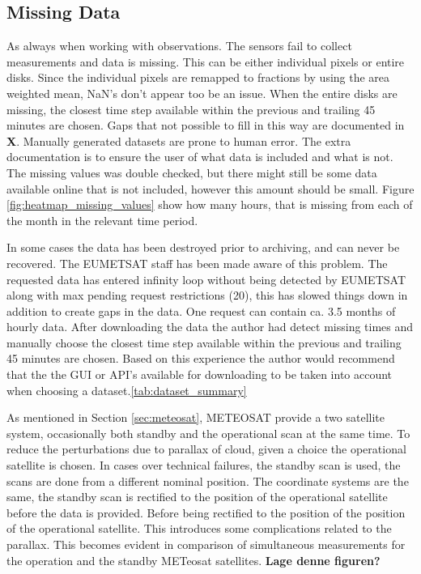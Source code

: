 \subsection{Missing Data} \label{sec:missing_values}
As always when working with observations. The sensors fail to collect  measurements and data is missing. This can be either individual pixels or entire disks. Since the individual pixels are remapped to fractions by using the area weighted mean, NaN's don't appear too be an issue. When the entire disks are missing, the closest time step available within the previous and trailing 45 minutes are chosen. Gaps that not possible to fill in this way are documented in \textbf{X}. Manually generated datasets are prone to human error. The extra documentation is to ensure the user of what data is included and what is not. The missing values was double checked, but there might still be some data available online that is not included, however this amount should be small. Figure \ref{fig:heatmap_missing_values} show how many hours, that is missing from each of the month in the relevant time period. 

In some cases the data has been destroyed prior to archiving, and can never be recovered. The EUMETSAT staff has been made aware of this problem. The requested data has entered infinity loop without being detected by EUMETSAT along with max pending request restrictions (20), this has slowed things down in addition to create gaps in the data. One request can contain ca. 3.5 months of hourly data. After downloading the data the author had detect missing times and manually choose the closest time step available within the previous and trailing 45 minutes are chosen. Based on this experience the author would recommend that the the GUI or API's available for downloading to be taken into account when choosing a dataset.\ref{tab:dataset_summary}

As mentioned in Section \ref{sec:meteosat}, METEOSAT provide a two satellite system, occasionally both standby and the operational scan at the same time. To reduce the perturbations due to parallax of cloud, given a choice the operational satellite is chosen. In cases over technical failures, the standby scan is used, the scans are done from a different nominal position. The coordinate systems are the same, the standby scan is rectified to the position of the operational satellite before the data is provided. 
Before being rectified to the position of the position of the operational satellite. This introduces some complications related to the parallax. This becomes evident in comparison of simultaneous measurements for the operation and the standby METeosat satellites. \textbf{Lage denne figuren?}


